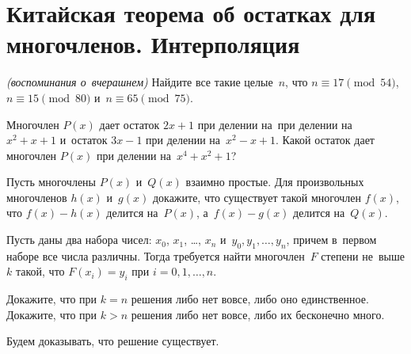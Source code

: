 
\section*{Китайская теорема об остатках для многочленов. Интерполяция}


\begin{problems}

\item \emph{(воспоминания о~вчерашнем)}
Найдите все такие целые~$n$, что
$n \equiv 17 \pmod{54}$, $n \equiv 15 \pmod{80}$ и~$n \equiv 65 \pmod{75}$.

\item
Многочлен $P(x)$ дает остаток $2 x + 1$ при делении на~при делении
на~$x^2 + x + 1$ и~остаток $3 x - 1$ при делении на~$x^2 - x + 1$.
Какой остаток дает многочлен $P(x)$ при делении на~$x^4 + x^2 + 1$?

\item
Пусть многочлены $P(x)$ и~$Q(x)$ взаимно простые.
Для произвольных многочленов $h(x)$ и~$g(x)$ докажите, что существует такой
многочлен $f(x)$, что $f(x) - h(x)$ делится на~$P(x)$, а~$f(x) - g(x)$ делится
на~$Q(x)$.

\end{problems}

Пусть даны два набора чисел:
$x_{0}$, $x_{1}$, \ldots, $x_{n}$ и~$y_{0}, y_{1}, \ldots, y_{n}$, причем
в~первом наборе все числа различны.
Тогда требуется найти многочлен~$F$ степени не~выше $k$ такой, что
$F(x_{i}) = y_{i}$ при $i = 0, 1, \ldots, n$.

\begin{problems}

\item
\subproblem
Докажите, что при $k = n$ решения либо нет вовсе, либо оно единственное.
\\
\subproblem
Докажите, что при $k > n$ решения либо нет вовсе, либо их бесконечно много.

\end{problems}

Будем доказывать, что решение существует.

